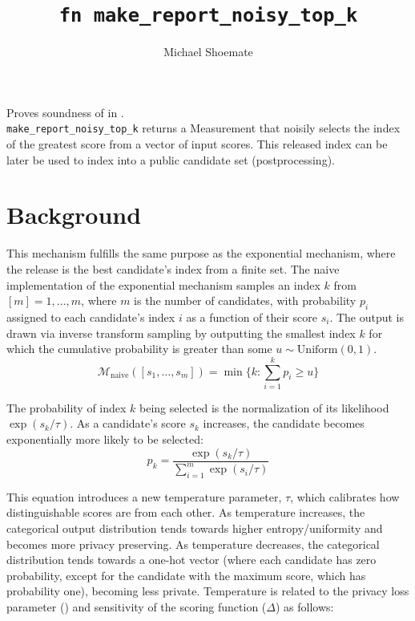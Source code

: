 \documentclass{article}
\title{\texttt{fn make\_report\_noisy\_top\_k}}
\author{Michael Shoemate}
\begin{document}
  
\maketitle 
 
Proves soundness of   
in .\\ 
\texttt{make\_report\_noisy\_top\_k} returns a Measurement that  
noisily selects the index of the greatest score from a vector of input scores. 
This released index can be later be used to index into a public candidate set (postprocessing). 
 
\section{Background}
This mechanism fulfills the same purpose as the exponential mechanism, 
where the release is the best candidate's index from a finite set.
The naive implementation of the exponential mechanism samples an index $k$ from $[m] = {1, \ldots, m}$, 
where $m$ is the number of candidates,
with probability $p_i$ assigned to each candidate's index $i$ as a function of their score $s_i$.
The output is drawn via inverse transform sampling
by outputting the smallest index $k$ for which the cumulative probability is greater than some $u \sim \mathrm{Uniform}(0, 1)$. 
\begin{equation}  
    \label{m-naive}  
    \mathcal{M}_{\mathrm{naive}}([s_1, \ldots, s_m]) = \min \{k: \sum_{i=1}^k p_i \ge u \}
\end{equation}
 
The probability of index $k$ being selected is the normalization of its likelihood $\exp(s_k / \tau)$. 
As a candidate's score $s_k$ increases, the candidate becomes exponentially more likely to be selected:
\begin{equation} 
    \label{prob-of-k} 
    p_k = \frac{\exp(s_k / \tau)}{\sum_{i = 1}^m \exp(s_i / \tau)} 
\end{equation} 
 
This equation introduces a new temperature parameter, $\tau$, 
which calibrates how distinguishable scores are from each other. 
As temperature increases, the categorical output distribution tends towards higher entropy/uniformity and becomes more privacy preserving. 
As temperature decreases, the categorical distribution tends towards a one-hot vector 
(where each candidate has zero probability, except for the candidate with the maximum score, which has probability one), 
becoming less private. 
Temperature is related to the privacy loss parameter (\dout) and sensitivity of the scoring function ($\Delta$) as follows: 
 
\end{document}
